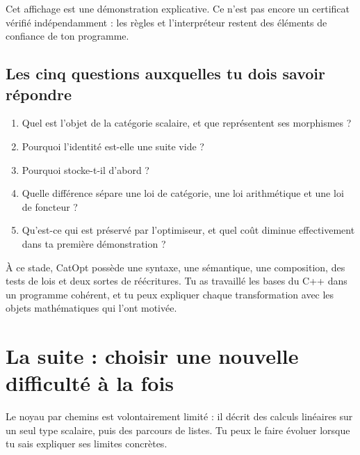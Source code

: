 \documentclass[11pt,a4paper]{article}
\newcommand{\code}[1]{\texttt{\detokenize{#1}}}
\begin{document}
Cet affichage est une démonstration explicative. Ce n'est pas encore un
certificat vérifié indépendamment : les règles et l'interpréteur restent
des éléments de confiance de ton programme.

\subsection{Les cinq questions auxquelles tu dois savoir répondre}
\begin{enumerate}
\item Quel est l'objet de la catégorie scalaire, et que représentent ses morphismes ?
\item Pourquoi l'identité est-elle une suite vide ?
\item Pourquoi \code{compose(g, f)} stocke-t-il d'abord \code{f} ?
\item Quelle différence sépare une loi de catégorie, une loi arithmétique
et une loi de foncteur ?
\item Qu'est-ce qui est préservé par l'optimiseur, et quel coût diminue
effectivement dans ta première démonstration ?
\end{enumerate}

\begin{objectif}
À ce stade, CatOpt possède une syntaxe, une sémantique, une composition,
des tests de lois et deux sortes de réécritures. Tu as travaillé les bases
du C++ dans un programme cohérent, et tu peux expliquer chaque transformation
avec les objets mathématiques qui l'ont motivée.
\end{objectif}

\clearpage
\section{La suite : choisir une nouvelle difficulté à la fois}
\label{sec:suite}
Le noyau par chemins est volontairement limité : il décrit des calculs
linéaires sur un seul type scalaire, puis des parcours de listes. Tu peux
le faire évoluer lorsque tu sais expliquer ses limites concrètes.
\end{document}
